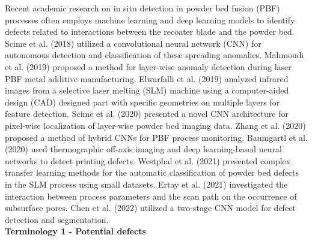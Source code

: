     Recent academic research on in situ detection in powder bed fusion (PBF) processes often employs machine learning and deep learning models to identify defects related to interactions between the recoater blade and the powder bed. Scime et al. (2018) utilized a convolutional neural network (CNN) for autonomous detection and classification of these spreading anomalies. Mahmoudi et al. (2019) proposed a method for layer-wise anomaly detection during laser PBF metal additive manufacturing. Elwarfalli et al. (2019) analyzed infrared images from a selective laser melting (SLM) machine using a computer-aided design (CAD) designed part with specific geometries on multiple layers for feature detection. Scime et al. (2020) presented a novel CNN architecture for pixel-wise localization of layer-wise powder bed imaging data. Zhang et al. (2020) proposed a method of hybrid CNNs for PBF process monitoring. Baumgartl et al. (2020) used thermographic off-axis imaging and deep learning-based neural networks to detect printing defects. Westphal et al. (2021) presented complex transfer learning methods for the automatic classification of powder bed defects in the SLM process using small datasets. Ertay et al. (2021) investigated the interaction between process parameters and the scan path on the occurrence of subsurface pores. Chen et al. (2022) utilized a two-stage CNN model for defect detection and segmentation.\\

    \textbf{Terminology 1 - Potential defects}\
    
